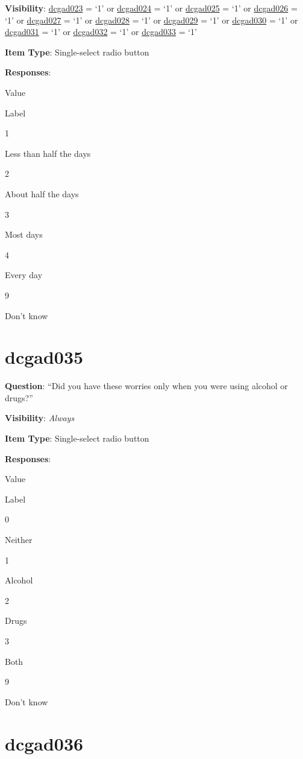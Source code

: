 \documentclass[]{book}
\begin{document}
\textbf{Visibility}: \protect\hyperlink{dcgad023}{dcgad023} = `1' or \protect\hyperlink{dcgad024}{dcgad024} = `1' or \protect\hyperlink{dcgad025}{dcgad025} = `1' or \protect\hyperlink{dcgad026}{dcgad026} = `1' or \protect\hyperlink{dcgad027}{dcgad027} = `1' or \protect\hyperlink{dcgad028}{dcgad028} = `1' or \protect\hyperlink{dcgad029}{dcgad029} = `1' or \protect\hyperlink{dcgad030}{dcgad030} = `1' or \protect\hyperlink{dcgad031}{dcgad031} = `1' or \protect\hyperlink{dcgad032}{dcgad032} = `1' or \protect\hyperlink{dcgad033}{dcgad033} = `1'

\textbf{Item Type}: Single-select radio button

\textbf{Responses}:

Value

Label

1

Less than half the days

2

About half the days

3

Most days

4

Every day

9

Don't know

\hypertarget{dcgad035}{%
\section{dcgad035}\label{dcgad035}}

\textbf{Question}: ``Did you have these worries only when you were using alcohol or drugs?''

\textbf{Visibility}: \emph{Always}

\textbf{Item Type}: Single-select radio button

\textbf{Responses}:

Value

Label

0

Neither

1

Alcohol

2

Drugs

3

Both

9

Don't know

\hypertarget{dcgad036}{%
\section{dcgad036}\label{dcgad036}}
\end{document}
